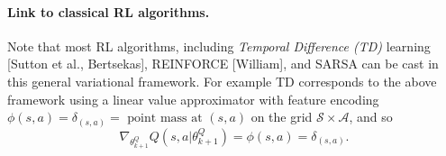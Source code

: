 \documentclass{article} %
\begin{document}
\paragraph{Link to classical RL algorithms.}
Note that most RL algorithms, including \textit{Temporal Difference (TD)}
learning [Sutton et al., Bertsekas], REINFORCE [William], and SARSA can be
cast in this general variational framework. For example TD corresponds to
the above framework using a linear value approximator with feature encoding
$\phi(s,a) = \delta_{(s,a)} =  \text{ point mass at }(s,a)$ on the grid
$\mathcal S \times \mathcal A$, and so
$$\nabla_{\theta^Q_{k+1}}Q(s, a|\theta^Q_{k+1}) = \phi(s, a) = \delta_{(s,a)}.$$
\end{document}
